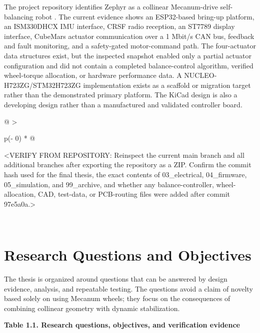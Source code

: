 The project repository identifies Zephyr as a collinear Mecanum-drive
self-balancing robot \cite{zephyr_repo}. The current evidence shows an ESP32-based
bring-up platform, an ISM330DHCX IMU interface, CRSF radio reception, an
ST7789 display interface, CubeMars actuator communication over a 1
Mbit\slash{}s CAN bus, feedback and fault monitoring, and a safety-gated
motor-command path. The four-actuator data structures exist, but the
inspected snapshot enabled only a partial actuator configuration and did
not contain a completed balance-control algorithm, verified wheel-torque
allocation, or hardware performance data. A NUCLEO-H723ZG\slash{}STM32H723ZG
implementation exists as a scaffold or migration target rather than the
demonstrated primary platform. The KiCad design is also a developing
design rather than a manufactured and validated controller board.

\begin{longtable}[]{@{}
  >{\raggedright\arraybackslash}p{(\columnwidth - 0\tabcolsep) * }@{}}
\toprule\noalign{}
\begin{minipage}[b]{\linewidth}\raggedright
\textless VERIFY FROM REPOSITORY: Reinspect the current main branch and
all additional branches after exporting the repository as a ZIP. Confirm
the commit hash used for the final thesis, the exact contents of
03\_electrical, 04\_firmware, 05\_simulation, and 99\_archive, and
whether any balance-controller, wheel-allocation, CAD, test-data, or
PCB-routing files were added after commit 97e5a0a.\textgreater{}
\end{minipage} \\
\midrule\noalign{}
\endhead
\bottomrule\noalign{}
\endlastfoot
\end{longtable}

\section{Research Questions and Objectives}\label{research-questions-and-objectives}

The thesis is organized around questions that can be answered by design
evidence, analysis, and repeatable testing. The questions avoid a claim
of novelty based solely on using Mecanum wheels; they focus on the
consequences of combining collinear geometry with dynamic stabilization.

\par\medskip\noindent\singlespacing
{}
\textbf{Table 1.1. Research questions, objectives, and verification evidence}\par

